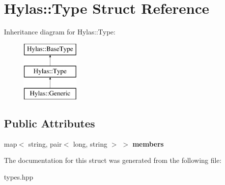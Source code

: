 \hypertarget{structHylas_1_1Type}{
\section{Hylas::Type Struct Reference}
\label{structHylas_1_1Type}
}
Inheritance diagram for Hylas::Type:\begin{figure}[H]
\begin{center}
\leavevmode
\includegraphics[height=3.000000cm]{structHylas_1_1Type}
\end{center}
\end{figure}
\subsection*{Public Attributes}
\begin{DoxyCompactItemize}
\item 
\hypertarget{structHylas_1_1Type_a28ed2feb5ad8a07dd272c8408c7cbb7f}{
map$<$ string, pair$<$ long, string $>$ $>$ {\bfseries members}}
\label{structHylas_1_1Type_a28ed2feb5ad8a07dd272c8408c7cbb7f}

\end{DoxyCompactItemize}


The documentation for this struct was generated from the following file:\begin{DoxyCompactItemize}
\item 
types.hpp\end{DoxyCompactItemize}
